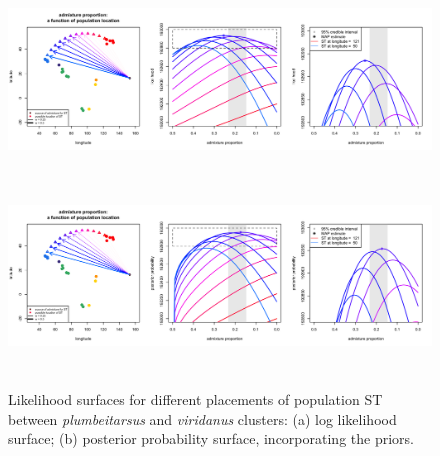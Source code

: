 \documentclass[12pt]{article}
\begin{document}
\begin{figure}
	\centering
			{\includegraphics[width=6in,height=2in]{figs/warblers/admix_prop_func_loc_lnl.png}}
			{\includegraphics[width=6in,height=2in]{figs/warblers/admix_prop_func_loc_prob.png}}
	\caption{Likelihood surfaces for different placements of population ST between \textit{plumbeitarsus} and \textit{viridanus} clusters: (a) log likelihood surface; (b) posterior probability surface, incorporating the priors.}\label{sfig:admix_prop_func_loc}
\end{figure}
\end{document}
